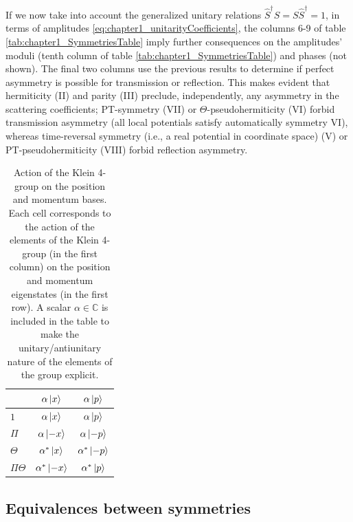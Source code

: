 If we now take into account the generalized unitary relations $\widehat{S}^\dagger S=S\widehat{S}^\dagger=1$, in terms of amplitudes \eqref{eq:chapter1_unitarityCoefficients}, the columns 6-9 of table \ref{tab:chapter1_SymmetriesTable} imply further consequences on the amplitudes' moduli (tenth column of table \ref{tab:chapter1_SymmetriesTable}) and phases (not shown). The final two columns use the previous results to determine if perfect asymmetry is possible for transmission or reflection.
This makes evident that hermiticity (II) and parity (III) preclude, independently, any asymmetry in the scattering coefficients;
PT-symmetry (VII) or  $\Theta$-pseudohermiticity
(VI) forbid transmission asymmetry (all local potentials  satisfy automatically
symmetry VI),  whereas time-reversal symmetry (i.e., a real potential in coordinate space)
(V) or  PT-pseudohermiticity (VIII) forbid reflection asymmetry.


\begin{table}
  \caption{Action of the Klein 4-group on the position and momentum bases. Each cell corresponds to the action of the elements of the Klein 4-group (in the first column) on the position and momentum eigenstates (in the first row). A scalar $\alpha \in \mathbb{C}$ is included in the table to make the unitary/antiunitary nature of the elements of the group explicit.}
  \label{tab:chapter1_KleinGroupOnPosAndMomentBases}
  \center
  \begin{tabular}{lcc}
    & $\alpha \ket{x}$ & $\alpha \ket{p}$\\
    \hline
    $1$ & $\alpha \ket{x}$ & $\alpha \ket{p}$\\ %
    $\Pi$  & $\alpha \ket{-x}$ & $\alpha \ket{-p}$\\ %
    $\Theta$ & $\alpha^* \ket{x}$ & $\alpha^* \ket{-p}$\\ %
    $\Pi\Theta$ & $\alpha^* \ket{-x}$ & $\alpha^* \ket{p}$\\ %
  \end{tabular}
\end{table}




\subsection{Equivalences between symmetries}


